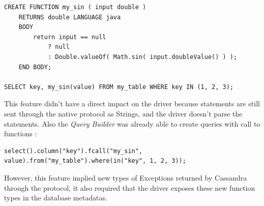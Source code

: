 \documentclass[a4paper]{report}
\begin{document}
\begin{lstlisting}[label=udf-ex-1, caption=User defined function in CQL, style=CQL]
CREATE FUNCTION my_sin ( input double )
    RETURNS double LANGUAGE java
    BODY
        return input == null
            ? null
            : Double.valueOf( Math.sin( input.doubleValue() ) );
    END BODY;

SELECT key, my_sin(value) FROM my_table WHERE key IN (1, 2, 3);
\end{lstlisting}
This feature didn't have a direct impact on the driver because statements are still sent through the native protocol as Strings, and the driver doesn't parse the statements. Also the \emph{Query Builder} was already able to create queries with call to functions :
\begin{lstlisting}[label=udfqb-ex-1, caption=Query Builder with UDF, style=Java]
select().column("key").fcall("my_sin", value).from("my_table").where(in("key", 1, 2, 3));
\end{lstlisting}
However, this feature implied new types of Exceptions returned by Cassandra through the protocol, it also required that the driver exposes these new function types in the database metadatas.
\end{document}
